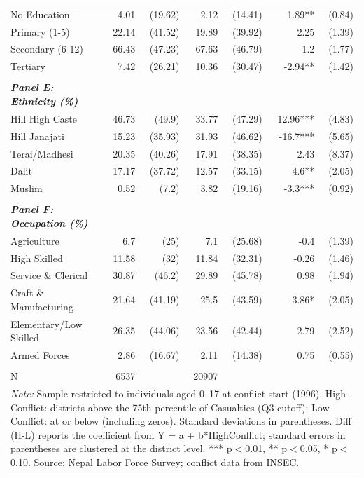\begin{landscape}
\begin{table}[!h]
{\begin{tabular}[t]{lrrrrrr}
No Education & 4.01 & (19.62) & 2.12 & (14.41) & 1.89** & (0.84)\\
Primary (1-5) & 22.14 & (41.52) & 19.89 & (39.92) & 2.25 & (1.39)\\
\addlinespace
Secondary (6-12) & 66.43 & (47.23) & 67.63 & (46.79) & -1.2 & (1.77)\\
Tertiary & 7.42 & (26.21) & 10.36 & (30.47) & -2.94** & (1.42)\\
 &  &  &  &  &  & \\
\em{\textbf{Panel E: Ethnicity (\%)}} & \em{\textbf{}} & \em{\textbf{}} & \em{\textbf{}} & \em{\textbf{}} & \em{\textbf{}} & \em{\textbf{}}\\
Hill High Caste & 46.73 & (49.9) & 33.77 & (47.29) & 12.96*** & (4.83)\\
\addlinespace
Hill Janajati & 15.23 & (35.93) & 31.93 & (46.62) & -16.7*** & (5.65)\\
Terai/Madhesi & 20.35 & (40.26) & 17.91 & (38.35) & 2.43 & (8.37)\\
Dalit & 17.17 & (37.72) & 12.57 & (33.15) & 4.6** & (2.05)\\
Muslim & 0.52 & (7.2) & 3.82 & (19.16) & -3.3*** & (0.92)\\
 &  &  &  &  &  & \\
\addlinespace
\em{\textbf{Panel F: Occupation (\%)}} & \em{\textbf{}} & \em{\textbf{}} & \em{\textbf{}} & \em{\textbf{}} & \em{\textbf{}} & \em{\textbf{}}\\
Agriculture & 6.7 & (25) & 7.1 & (25.68) & -0.4 & (1.39)\\
High Skilled & 11.58 & (32) & 11.84 & (32.31) & -0.26 & (1.46)\\
Service \& Clerical & 30.87 & (46.2) & 29.89 & (45.78) & 0.98 & (1.94)\\
Craft \& Manufacturing & 21.64 & (41.19) & 25.5 & (43.59) & -3.86* & (2.05)\\
\addlinespace
Elementary/Low Skilled & 26.35 & (44.06) & 23.56 & (42.44) & 2.79 & (2.52)\\
Armed Forces & 2.86 & (16.67) & 2.11 & (14.38) & 0.75 & (0.55)\\
 &  &  &  &  &  & \\
N & 6537 &  & 20907 &  &  & \\
\bottomrule
\multicolumn{7}{l}{\rule{0pt}{1em}\textit{Note: } Sample restricted to individuals aged 0--17 at conflict start (1996). High-Conflict: districts above the 75th percentile of Casualties (Q3 cutoff); Low-Conflict: at or below (including zeros). Standard deviations in parentheses. Diff (H-L) reports the coefficient from Y = a + b*HighConflict; standard errors in parentheses are clustered at the district level. *** p$<$0.01, ** p$<$0.05, * p$<$0.10. Source: Nepal Labor Force Survey; conflict data from INSEC.}\\
\end{tabular}}
\end{table}
\end{landscape}
